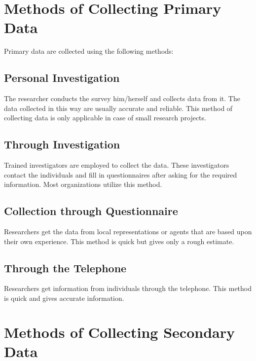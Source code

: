 \documentclass[
]{book}
\begin{document}
\hypertarget{methods-of-collecting-primary-data}{%
\section{Methods of Collecting Primary Data}\label{methods-of-collecting-primary-data}}

Primary data are collected using the following methods:

\hypertarget{personal-investigation}{%
\subsection{Personal Investigation}\label{personal-investigation}}

The researcher conducts the survey him/herself and collects data from it. The data collected in this way are usually accurate and reliable. This method of collecting data is
only applicable in case of small research projects.

\hypertarget{through-investigation}{%
\subsection{Through Investigation}\label{through-investigation}}

Trained investigators are employed to collect the data. These investigators contact the individuals and fill in
questionnaires after asking for the required information. Most organizations utilize this method.

\hypertarget{collection-through-questionnaire}{%
\subsection{Collection through Questionnaire}\label{collection-through-questionnaire}}

Researchers get the data from local representations or agents that are based upon their own experience. This method is quick but gives only a rough estimate.

\hypertarget{through-the-telephone}{%
\subsection{Through the Telephone}\label{through-the-telephone}}

Researchers get information from individuals through the telephone. This method is quick and gives accurate information.

\hypertarget{methods-of-collecting-secondary-data}{%
\section{Methods of Collecting Secondary Data}\label{methods-of-collecting-secondary-data}}
\end{document}
